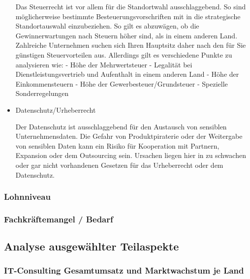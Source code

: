 \begin{itemize}
 Das Steuerrecht ist vor allem für die Standortwahl ausschlaggebend. 
 So sind möglicherweise bestimmte Besteuerungsvorschriften mit in die strategische Standortauswahl einzubeziehen. So gilt es abzuwägen, ob die Gewinnerwartungen nach Steuern höher sind, als in einem anderen Land. Zahlreiche Unternehmen suchen sich Ihren Hauptsitz daher nach den für Sie günstigen Steuervorteilen aus.
 Allerdings gilt es verschiedene Punkte zu analysieren wie:
 - Höhe der Mehrwertsteuer
 - Legalität bei Dienstleistungsvertrieb und Aufenthalt in einem anderen Land
 - Höhe der Einkommensteuern
 - Höhe der Gewerbesteuer/Grundsteuer
 - Spezielle Sonderregelungen
  \\
\item {Datenschutz/Urheberrecht}

  Der Datenschutz ist ausschlaggebend für den Austausch von sensiblen Unternehmensdaten. 
  Die Gefahr von Produktpiraterie oder der Weitergabe von sensiblen Daten kann ein Risiko für Kooperation mit Partnern, Expansion oder dem Outsourcing sein. Ursachen liegen hier in zu schwachen oder gar nicht vorhandenen Gesetzen für das Urheberrecht oder dem Datenschutz.
  
  \end{itemize}
\subsubsection{Lohnniveau}
\subsubsection{Fachkräftemangel / Bedarf}
\subsection{Analyse ausgewählter Teilaspekte}
\subsubsection{IT-Consulting Gesamtumsatz und Marktwachstum je Land}
\label{subsubsec:Gesamtumsatz}

